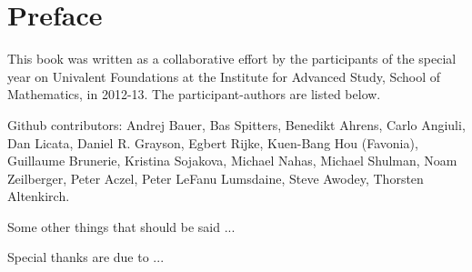 \chapter*{Preface}
\label{cha:preface}


{%


%

This book was written as a collaborative effort by the participants of the special year on Univalent Foundations at the  Institute for Advanced Study, School of Mathematics, in 2012-13.  The participant-authors are listed below.


Github contributors:
Andrej Bauer,
Bas Spitters,
Benedikt Ahrens,
Carlo Angiuli,
Dan Licata,
Daniel R. Grayson,
Egbert Rijke,
Kuen-Bang Hou (Favonia),
Guillaume Brunerie,
Kristina Sojakova,
Michael Nahas,
Michael Shulman,
Noam Zeilberger,
Peter Aczel,
Peter LeFanu Lumsdaine,
Steve Awodey,
Thorsten Altenkirch.


Some other things that should be said ...

Special thanks are due to ...

\bigskip



}%


